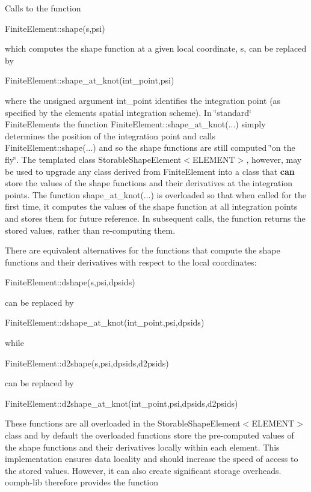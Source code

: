 \begin{DoxyItemize}
\item Calls to the function 
\begin{DoxyCode}
FiniteElement::shape(s,psi)
\end{DoxyCode}
 which computes the shape function at a given local coordinate, {\ttfamily s}, can be replaced by 
\begin{DoxyCode}
FiniteElement::shape\_at\_knot(int\_point,psi)
\end{DoxyCode}
 where the {\ttfamily unsigned} argument {\ttfamily int\+\_\+point} identifies the integration point (as specified by the element\textquotesingle{}s spatial integration scheme). In \char`\"{}standard\char`\"{} {\ttfamily Finite\+Elements} the function {\ttfamily Finite\+Element\+::shape\+\_\+at\+\_\+knot}(...) simply determines the position of the integration point and calls {\ttfamily Finite\+Element\+::shape}(...) and so the shape functions are still computed \char`\"{}on the fly\char`\"{}. The templated class {\ttfamily Storable\+Shape\+Element$<$\+E\+L\+E\+M\+E\+N\+T$>$}, however, may be used to upgrade any class derived from {\ttfamily Finite\+Element} into a class that {\bfseries can} store the values of the shape functions and their derivatives at the integration points. The function {\ttfamily shape\+\_\+at\+\_\+knot}(...) is overloaded so that when called for the first time, it computes the values of the shape function at all integration points and stores them for future reference. In subsequent calls, the function returns the stored values, rather than re-\/computing them.
\item There are equivalent alternatives for the functions that compute the shape functions and their derivatives with respect to the local coordinates\+: 
\begin{DoxyCode}
FiniteElement::dshape(s,psi,dpsids)
\end{DoxyCode}
 can be replaced by 
\begin{DoxyCode}
FiniteElement::dshape\_at\_knot(int\_point,psi,dpsids)
\end{DoxyCode}
 while 
\begin{DoxyCode}
FiniteElement::d2shape(s,psi,dpsids,d2psids)
\end{DoxyCode}
 can be replaced by 
\begin{DoxyCode}
FiniteElement::d2shape\_at\_knot(int\_point,psi,dpsids,d2psids)
\end{DoxyCode}

\end{DoxyItemize}These functions are all overloaded in the {\ttfamily Storable\+Shape\+Element$<$\+E\+L\+E\+M\+E\+N\+T$>$} class and by default the overloaded functions store the pre-\/computed values of the shape functions and their derivatives locally within each element. This implementation ensures data locality and should increase the speed of access to the stored values. However, it can also create significant storage overheads. {\ttfamily oomph-\/lib} therefore provides the function 
